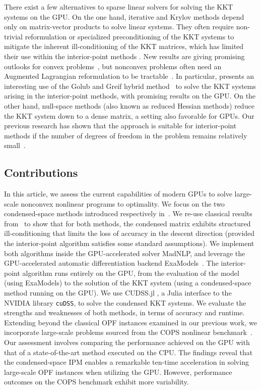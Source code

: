 There exist a few alternatives to sparse linear solvers for solving the KKT systems on the GPU.
On the one hand, iterative and Krylov methods depend only on matrix-vector products to solve linear systems.
They often require non-trivial reformulation or
specialized preconditioning of the KKT systems to mitigate the
inherent ill-conditioning of the KKT matrices, which has limited their
use within the interior-point methods
\cite{curtisNoteImplementationInteriorpoint2012,rodriguezScalablePreconditioningBlockstructured2020}.
New results are giving promising outlooks for convex problems~\cite{ghannad2022linear},
but nonconvex problems often need an Augmented Lagrangian reformulation
to be tractable~\cite{cao2016augmented,regev2023hykkt}. In particular,
\cite{regev2023hykkt} presents an interesting use of the Golub and Greif
hybrid method~\cite{golub2003solving} to solve the KKT systems arising in
the interior-point methods, with promising results on the GPU.
On the other hand, null-space methods (also known as reduced Hessian methods)
reduce the KKT system down to a dense matrix, a setting also favorable for GPUs.
Our previous research has shown that the approach is suitable for  interior-point
methods if the number of degrees of freedom in the problem remains relatively small~\cite{pacaud2022condensed}.


\subsection{Contributions}
In this article, we assess the current capabilities of modern GPUs
to solve large-scale nonconvex nonlinear programs to optimality.
We focus on the two condensed-space methods
introduced respectively in~\cite{regev2023hykkt,shin2023accelerating}.
We re-use classical results from~\cite{wright1998ill} to show
that for both methods, the condensed matrix exhibits
structured ill-conditioning that limits the loss of accuracy in
the descent direction (provided the interior-point algorithm satisfies
some standard assumptions).
We implement both algorithms inside the GPU-accelerated solver MadNLP,
and leverage the GPU-accelerated automatic differentiation
backend ExaModels~\cite{shin2023accelerating}.
The interior-point algorithm runs entirely on the GPU, from
the evaluation of the model (using ExaModels) to the solution of
the KKT system (using a condensed-space method running on the GPU).
We use CUDSS.jl \cite{Montoison_CUDSS}, a Julia interface to the NVIDIA library {\tt cuDSS},
to solve the condensed KKT systems. We evaluate the strengths
and weaknesses of both methods, in terms of accuracy and runtime.
Extending beyond the classical OPF instances examined in our previous work,
we incorporate large-scale problems sourced from the COPS nonlinear benchmark~\cite{dolan2004benchmarking}.
Our assessment involves comparing the performance achieved on the GPU with that of a state-of-the-art method executed on the CPU.
The findings reveal that the condensed-space IPM enables a remarkable ten-time acceleration in solving large-scale OPF instances when utilizing the GPU.
However, performance outcomes on the COPS benchmark exhibit more variability.

